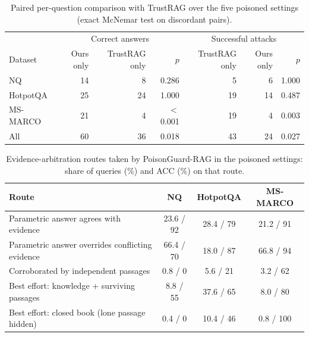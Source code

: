 \begin{table}[t]\centering\small\caption{Paired per-question comparison with TrustRAG over the five poisoned settings (exact McNemar test on discordant pairs).}\label{tab:paired}
\begin{tabular}{lrrrrrr}\toprule & \multicolumn{3}{c}{Correct answers} & \multicolumn{3}{c}{Successful attacks} \\ Dataset & Ours only & TrustRAG only & $p$ & TrustRAG only & Ours only & $p$ \\\midrule
NQ & 14 & 8 & 0.286 & 5 & 6 & 1.000 \\
HotpotQA & 25 & 24 & 1.000 & 19 & 14 & 0.487 \\
MS-MARCO & 21 & 4 & $<$0.001 & 19 & 4 & 0.003 \\
\midrule
All & 60 & 36 & 0.018 & 43 & 24 & 0.027 \\
\bottomrule\end{tabular}\end{table}

\begin{table}[t]\centering\small\caption{Evidence-arbitration routes taken by PoisonGuard-RAG in the poisoned settings: share of queries (\%) and ACC (\%) on that route.}\label{tab:routes}
\begin{tabular}{lccc}\toprule Route & NQ & HotpotQA & MS-MARCO \\\midrule
Parametric answer agrees with evidence & 23.6 / 92 & 28.4 / 79 & 21.2 / 91 \\
Parametric answer overrides conflicting evidence & 66.4 / 70 & 18.0 / 87 & 66.8 / 94 \\
Corroborated by independent passages & 0.8 / 0 & 5.6 / 21 & 3.2 / 62 \\
Best effort: knowledge + surviving passages & 8.8 / 55 & 37.6 / 65 & 8.0 / 80 \\
Best effort: closed book (lone passage hidden) & 0.4 / 0 & 10.4 / 46 & 0.8 / 100 \\
\bottomrule\end{tabular}\end{table}
